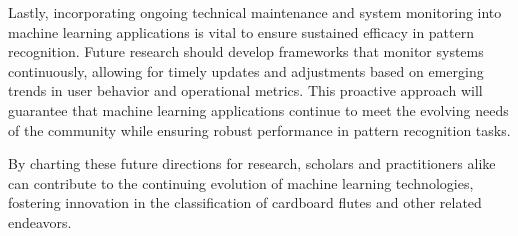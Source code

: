 Lastly, incorporating ongoing technical maintenance and system monitoring into machine learning applications is vital to ensure sustained efficacy in pattern recognition. Future research should develop frameworks that monitor systems continuously, allowing for timely updates and adjustments based on emerging trends in user behavior and operational metrics. This proactive approach will guarantee that machine learning applications continue to meet the evolving needs of the community while ensuring robust performance in pattern recognition tasks. 

By charting these future directions for research, scholars and practitioners alike can contribute to the continuing evolution of machine learning technologies, fostering innovation in the classification of cardboard flutes and other related endeavors.
